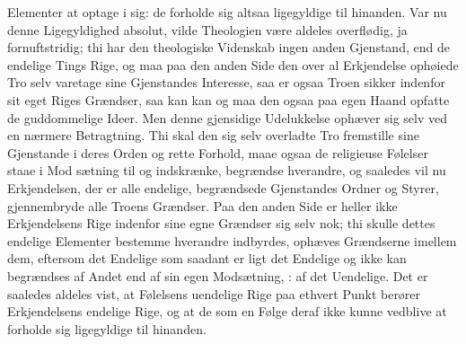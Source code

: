 \documentclass[12pt]{book}
\newcommand{\dsi}{\reflectbox{c}:}
\newcommand{\opage}[1]{\marginnote{\footnotesize\textit{[#1]}}}
\begin{document}
Elementer at optage i sig: de forholde sig altsaa ligegyldige til hinanden. Var
nu denne Ligegyldighed absolut, vilde Theologien være aldeles overflødig, ja
fornuftstridig; thi har den theologiske Videnskab ingen anden Gjenstand, end de
endelige Tings Rige, og maa paa den anden Side den over al Erkjendelse ophøiede
Tro selv varetage sine Gjenstandes Interesse, saa er ogsaa Troen sikker
indenfor sit eget Riges Grændser, saa kan kan og maa den ogsaa paa egen Haand
opfatte de guddommelige Ideer. Men denne gjensidige Udelukkelse ophæver sig
selv ved en nærmere Betragtning. Thi skal den sig selv overladte Tro fremstille
sine Gjenstande i deres Orden og rette Forhold, maae ogsaa de religieuse
Følelser staae i Mod\-%
\opage{123}sætning til og indskrænke, begrændse hverandre, og saaledes vil nu
Erkjendelsen, der er alle endelige, begrændsede Gjenstandes Ordner og Styrer,
gjennembryde alle Troens Grændser. Paa den anden Side er heller ikke
Erkjendelsens Rige indenfor sine egne Grændser sig selv nok; thi skulle dettes
endelige Elementer bestemme hverandre indbyrdes, ophæves Grændserne imellem
dem, eftersom det Endelige som saadant er ligt det Endelige og ikke kan
begrændses af Andet end af sin egen Modsætning, \dsi{} af det Uendelige. Det er
saaledes aldeles vist, at Følelsens uendelige Rige paa ethvert Punkt berører
Erkjendelsens endelige Rige, og at de som en Følge deraf ikke kunne vedblive at
forholde sig ligegyldige til hinanden.
\end{document}
